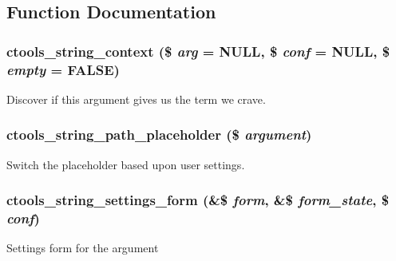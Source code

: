 \subsection{Function Documentation}
\hypertarget{arguments_2string_8inc_ad47d630ad294ffd29f4dc502b07416ae}{
\subsubsection[{ctools\_\-string\_\-context}]{\setlength{\rightskip}{0pt plus 5cm}ctools\_\-string\_\-context (\$ {\em arg} = {\ttfamily NULL}, \/  \$ {\em conf} = {\ttfamily NULL}, \/  \$ {\em empty} = {\ttfamily FALSE})}}
\label{arguments_2string_8inc_ad47d630ad294ffd29f4dc502b07416ae}
Discover if this argument gives us the term we crave. \hypertarget{arguments_2string_8inc_ae35deb3ebcdeeb584ef025aac2ff6cf3}{
\subsubsection[{ctools\_\-string\_\-path\_\-placeholder}]{\setlength{\rightskip}{0pt plus 5cm}ctools\_\-string\_\-path\_\-placeholder (\$ {\em argument})}}
\label{arguments_2string_8inc_ae35deb3ebcdeeb584ef025aac2ff6cf3}
Switch the placeholder based upon user settings. \hypertarget{arguments_2string_8inc_ab40b10ac883ae70f03cf674629d6737b}{
\subsubsection[{ctools\_\-string\_\-settings\_\-form}]{\setlength{\rightskip}{0pt plus 5cm}ctools\_\-string\_\-settings\_\-form (\&\$ {\em form}, \/  \&\$ {\em form\_\-state}, \/  \$ {\em conf})}}
\label{arguments_2string_8inc_ab40b10ac883ae70f03cf674629d6737b}
Settings form for the argument 

